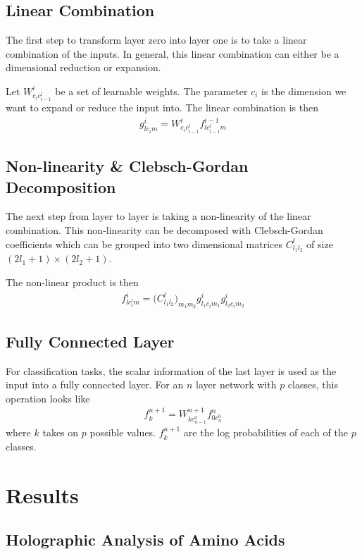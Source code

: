 \documentclass{article}
\begin{document}
\subsection{Linear Combination}
The first step to transform layer zero into layer one is to take a linear combination of the inputs. In general, this linear combination can either be a dimensional reduction or expansion. 

Let $W^i_{c_{i}c^l_{i-1}}$ be a set of learnable weights. The parameter $c_i$ is the dimension we want to expand or reduce the input into. The linear combination is then
\begin{align}
    g^{i}_{lc_{i}m} = W^i_{c_{i}c^l_{i-1}}f^{i-1}_{lc^l_{i-1}m} 
\end{align}

\subsection{Non-linearity \& Clebsch-Gordan Decomposition}
The next step from layer to layer is taking a non-linearity of the linear combination. This non-linearity can be decomposed with Clebsch-Gordan coefficients which can be grouped into two dimensional matrices $C^l_{l_1 l_2}$ of size $(2l_1+1)\times(2l_2+1)$.

The non-linear product is then
\begin{align}
    f^{i}_{lc^l_im} = \big(C^l_{l_1l_2}\big)_{m_1m_2} g^{i}_{l_1c_{i}m_1} g^{i}_{l_2c_{i}m_2}
\end{align}

\subsection{Fully Connected Layer}
For classification tasks, the scalar information of the last layer is used as the input into a fully connected layer. For an $n$ layer network with $p$ classes, this operation looks like
\begin{align}
    f^{n+1}_k = W^{n+1}_{kc^0_{n-1}} f^{n}_{0c^0_{n}}
\end{align}
where $k$ takes on $p$ possible values. $f^{n+1}_k$ are the log probabilities of each of the $p$ classes.

\section{Results}

\subsection{Holographic Analysis of Amino Acids}
\end{document}
